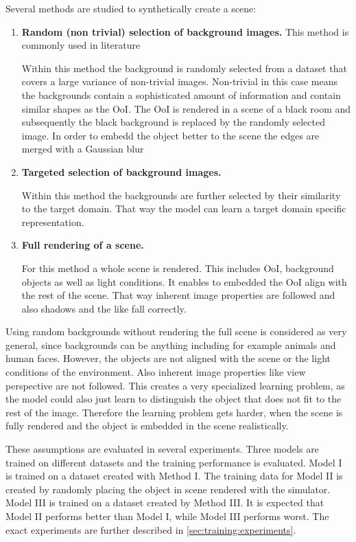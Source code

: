 Several methods are studied to synthetically create a scene:

\begin{enumerate}
	
\item \textbf{Random (non trivial) selection of background images.}
This method is commonly used in literature 

Within this method the background is randomly selected from a dataset that covers a large variance of non-trivial images. Non-trivial in this case means the backgrounds contain a sophisticated amount of information and contain similar shapes as the \ac{OoI}. The \ac{OoI} is rendered in a scene of a black room and subsequently the black background is replaced by the randomly selected image. In order to embedd the object better to the scene the edges are merged with a Gaussian blur 

\item \textbf{Targeted selection of background images.}

Within this method the backgrounds are further selected by their similarity to the target domain. That way the model can learn a target domain specific representation.

\item \textbf{Full rendering of a scene.}

For this method a whole scene is rendered. This includes \ac{OoI}, background objects as well as light conditions. It enables to embedded the \ac{OoI} align with the rest of the scene. That way inherent image properties are followed and also shadows and the like fall correctly.

\end{enumerate}

Using random backgrounds without rendering the full scene is considered as very general, since backgrounds can be anything including for example animals and human faces. However, the objects are not aligned with the scene or the light conditions of the environment. Also inherent image properties like view perspective are not followed. This creates a very specialized learning problem, as the model could also just learn to distinguish the object that does not fit to the rest of the image. Therefore the learning problem gets harder, when the scene is fully rendered and the object is embedded in the scene realistically. 

These assumptions are evaluated in several experiments. Three models are trained on different datasets and the training performance is evaluated. Model I is trained on a dataset created with Method I. The training data for Model II is created by randomly placing the object in scene rendered with the simulator. Model III is trained on a dataset created by Method III. It is expected that Model II performs better than Model I, while Model III performs worst. The exact experiments are further described in \autoref{sec:training:experiments}.

